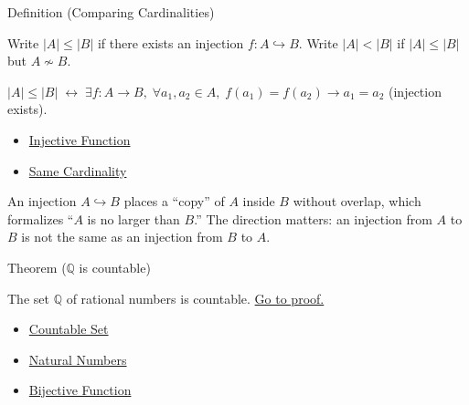 
\begin{definitionbox}{Definition (Comparing Cardinalities)}
\begin{definition}\label{def:cardinality-order}
Write $|A| \leq |B|$ if there exists an injection $f : A \hookrightarrow B$.
Write $|A| < |B|$ if $|A| \leq |B|$ but $A \not\sim B$.
\end{definition}
\end{definitionbox}

\begin{remark*}
$|A|\leq|B| \;\leftrightarrow\; \exists f: A\to B,\; \forall a_1,a_2\in A,\; f(a_1)=f(a_2)\to a_1=a_2$ (injection exists).
\end{remark*}


\begin{dependencies}
\begin{itemize}
  \item \hyperref[def:injective]{Injective Function}
  \item \hyperref[def:same-cardinality]{Same Cardinality}
\end{itemize}
\end{dependencies}

\begin{remark*}
An injection $A \hookrightarrow B$ places a ``copy'' of $A$ inside $B$
without overlap, which formalizes ``$A$ is no larger than $B$.'' The direction
matters: an injection from $A$ to $B$ is not the same as an injection from
$B$ to $A$.
\end{remark*}


\begin{theorembox}{Theorem ($\mathbb{Q}$ is countable)}
\begin{theorem}\label{thm:Q-countable}
The set $\mathbb{Q}$ of rational numbers is countable.
\hyperref[prf:q-countable]{Go to proof.}
\end{theorem}
\end{theorembox}

\begin{dependencies}
\begin{itemize}
  \item \hyperref[def:countable]{Countable Set}
  \item \hyperref[def:natural-numbers]{Natural Numbers}
  \item \hyperref[def:bijective]{Bijective Function}
\end{itemize}
\end{dependencies}

